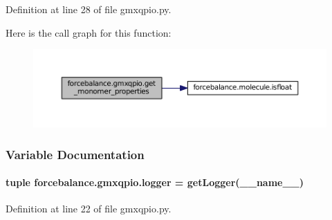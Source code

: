 Definition at line 28 of file gmxqpio.\-py.



Here is the call graph for this function\-:
\nopagebreak
\begin{figure}[H]
\begin{center}
\leavevmode
\includegraphics[width=350pt]{namespaceforcebalance_1_1gmxqpio_a499ed366638eae7be524b18760a986b8_cgraph}
\end{center}
\end{figure}




\subsubsection{Variable Documentation}
\hypertarget{namespaceforcebalance_1_1gmxqpio_a0e3453a2d1b91945807c4b5e27b062a5}{
\paragraph[{logger}]{\setlength{\rightskip}{0pt plus 5cm}tuple forcebalance.\-gmxqpio.\-logger = get\-Logger(\-\_\-\-\_\-name\-\_\-\-\_\-)}}\label{namespaceforcebalance_1_1gmxqpio_a0e3453a2d1b91945807c4b5e27b062a5}


Definition at line 22 of file gmxqpio.\-py.

